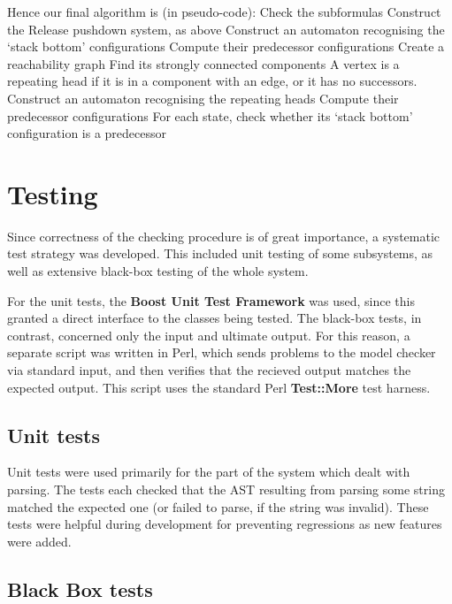 \documentclass[11pt]{article}
\theoremstyle{definition}
\begin{document}
{%




Hence our final algorithm is (in pseudo-code):
Check the subformulas
Construct the Release pushdown system, as above
Construct an automaton recognising the `stack bottom' configurations
Compute their predecessor configurations
Create a reachability graph
Find its strongly connected components
A vertex is a repeating head if it is in a component with an edge, or it has no successors.
Construct an automaton recognising the repeating heads
Compute their predecessor configurations
For each state, check whether its `stack bottom' configuration is a predecessor


\section{Testing}

Since correctness of the checking procedure is of great importance, a
systematic test strategy was developed. This included unit testing of some
subsystems, as well as extensive black-box testing of the whole system.

For the unit tests, the \textbf{Boost Unit Test Framework} was used, since this
granted a direct interface to the classes being tested. The black-box tests, in
contrast, concerned only the input and ultimate output. For this reason, a
separate script was written in Perl, which sends problems to the model checker
via standard input, and then verifies that the recieved output matches the
expected output. This script uses the standard Perl \textbf{Test::More} test
harness.

\subsection{Unit tests}

Unit tests were used primarily for the part of the system which dealt with
parsing. The tests each checked that the AST resulting from parsing some string
matched the expected one (or failed to parse, if the string was invalid). These
tests were helpful during development for preventing regressions as new
features were added.


\subsection{Black Box tests}




}
\end{document}
